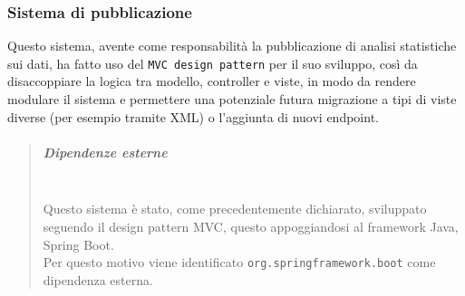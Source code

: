         \subsubsection{Sistema di pubblicazione}
            Questo sistema, avente come responsabilità la pubblicazione di analisi statistiche sui dati, ha fatto uso del \texttt{MVC design pattern} per il suo sviluppo, così da disaccoppiare la logica tra modello, controller e viste, in modo da rendere modulare il sistema e permettere una potenziale futura migrazione a tipi di viste diverse (per esempio tramite XML) o l'aggiunta di nuovi endpoint.\\
            \begin{quote}
            	\mbox{}%
            	\vspace{-1cm}
                    \subparagraph{Dipendenze esterne}
                    \mbox{} \\
                        Questo sistema è stato, come precedentemente dichiarato, sviluppato seguendo il design pattern MVC, questo appoggiandosi al framework Java, Spring Boot. \\
                        Per questo motivo viene identificato \texttt{org.springframework.boot} come dipendenza esterna. 
            \end{quote}
        \newpage
